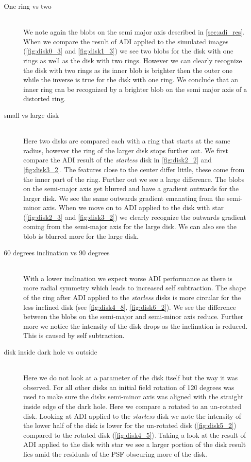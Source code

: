 \begin{description}
\item[One ring vs two] \hfill \\
We note again the blobs on the semi major axis described in \autoref{sec:adi_res}. When we compare the result of \ac{ADI} applied to the simulated images (\autoref{fig:disk0_3} and \ref{fig:disk1_3}) we see two blobs for the disk with one rings as well as the disk with two rings. However we can clearly recognize the disk with two rings as its inner blob is brighter then the outer one while the inverse is true for the disk with one ring. We conclude that an inner ring can be recognized by a brighter blob on the semi major axis of a distorted ring.

\item[small vs large disk] \hfill \\
Here two disks are compared each with a ring that starts at the same radius, however the ring of the larger disk stops further out. We first compare the \ac{ADI} result of the \textit{starless} disk in \autoref{fig:disk2_2} and \autoref{fig:disk3_2}. The features close to the center differ little, these come from the inner part of the ring. Further out we see a large difference. The blobs on the semi-major axis get blurred and have a gradient outwards for the larger disk. We see the same outwards gradient emanating from the semi-minor axis. When we move on to \ac{ADI} applied to the disk with star (\autoref{fig:disk2_3} and \ref{fig:disk3_2}) we clearly recognize the outwards gradient coming from the semi-major axis for the large disk. We can also see the blob is blurred more for the large disk.

\item[60 degrees inclination vs 90 degrees] \hfill \\
With a lower inclination we expect worse \ac{ADI} performance as there is more radial symmetry which leads to increased self subtraction. The shape of the ring after \ac{ADI} applied to the \textit{starless} disks is more circular for the less inclined disk (see \autoref{fig:disk4_8}, \autoref{fig:disk6_2}). We see the difference between the blobs on the semi-major and semi-minor axis reduce. Further more we notice the intensity of the disk drops as the inclination is reduced. This is caused by self subtraction. 

\item[disk inside dark hole vs outside] \hfill \\ 
Here we do not look at a parameter of the disk itself but the way it was observed. For all other disks an initial field rotation of 120 degrees was used to make sure the disks semi-minor axis was aligned with the straight inside edge of the dark hole. Here we compare a rotated to an un-rotated disk. Looking at \ac{ADI} applied to the \textit{starless} disk we note the intensity of the lower half of the disk is lower for the un-rotated disk (\autoref{fig:disk5_2}) compared to the rotated disk (\autoref{fig:disk4_5}). Taking a look at the result of \ac{ADI} applied to the disk with star we see a larger portion of the disk result lies amid the residuals of the \ac{PSF} obscuring more of the disk.
\end{description}


